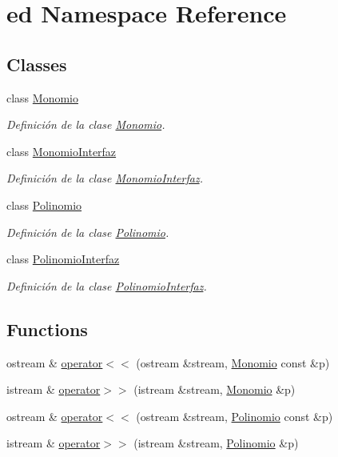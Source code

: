 \hypertarget{namespaceed}{\section{ed Namespace Reference}
\label{namespaceed}
}
\subsection*{Classes}
\begin{DoxyCompactItemize}
\item 
class \hyperlink{classed_1_1Monomio}{Monomio}
\begin{DoxyCompactList}\small\item\em Definición de la clase \hyperlink{classed_1_1Monomio}{Monomio}. \end{DoxyCompactList}\item 
class \hyperlink{classed_1_1MonomioInterfaz}{Monomio\-Interfaz}
\begin{DoxyCompactList}\small\item\em Definición de la clase \hyperlink{classed_1_1MonomioInterfaz}{Monomio\-Interfaz}. \end{DoxyCompactList}\item 
class \hyperlink{classed_1_1Polinomio}{Polinomio}
\begin{DoxyCompactList}\small\item\em Definición de la clase \hyperlink{classed_1_1Polinomio}{Polinomio}. \end{DoxyCompactList}\item 
class \hyperlink{classed_1_1PolinomioInterfaz}{Polinomio\-Interfaz}
\begin{DoxyCompactList}\small\item\em Definición de la clase \hyperlink{classed_1_1PolinomioInterfaz}{Polinomio\-Interfaz}. \end{DoxyCompactList}\end{DoxyCompactItemize}
\subsection*{Functions}
\begin{DoxyCompactItemize}
\item 
ostream \& \hyperlink{namespaceed_a741b43394bfe10620139a91ae65bf93c}{operator$<$$<$} (ostream \&stream, \hyperlink{classed_1_1Monomio}{Monomio} const \&p)
\item 
istream \& \hyperlink{namespaceed_afe8742ffe980d202ce5c6d3bc9a0aea3}{operator$>$$>$} (istream \&stream, \hyperlink{classed_1_1Monomio}{Monomio} \&p)
\item 
ostream \& \hyperlink{namespaceed_a7e9c987335ee267d8c9d405a9b36b87f}{operator$<$$<$} (ostream \&stream, \hyperlink{classed_1_1Polinomio}{Polinomio} const \&p)
\item 
istream \& \hyperlink{namespaceed_adf08b7a71eb5c75b9a1032e42cbf3215}{operator$>$$>$} (istream \&stream, \hyperlink{classed_1_1Polinomio}{Polinomio} \&p)
\end{DoxyCompactItemize}



